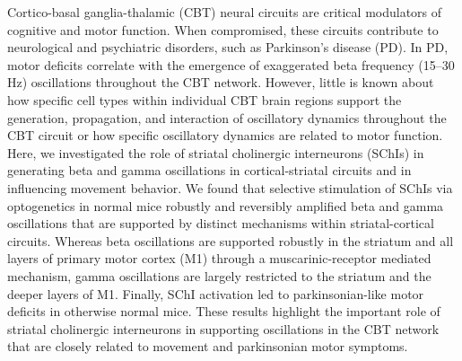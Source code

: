 Cortico-basal ganglia-thalamic (CBT) neural circuits are critical modulators of cognitive and motor function.
When compromised, these circuits contribute to neurological and psychiatric disorders, such as Parkinson’s disease (PD).
In PD, motor deficits correlate with the emergence of exaggerated beta frequency (15–30 Hz) oscillations throughout the CBT network.
However, little is known about how specific cell types within individual CBT brain regions support the generation, propagation, and interaction of oscillatory dynamics throughout the CBT circuit or how specific oscillatory dynamics are related to motor function.
Here, we investigated the role of striatal cholinergic interneurons (SChIs) in generating beta and gamma oscillations in cortical-striatal circuits and in influencing movement behavior.
We found that selective stimulation of SChIs via optogenetics in normal mice robustly and reversibly amplified beta and gamma oscillations that are supported by distinct mechanisms within striatal-cortical circuits.
Whereas beta oscillations are supported robustly in the striatum and all layers of primary motor cortex (M1) through a muscarinic-receptor mediated mechanism, gamma oscillations are largely restricted to the striatum and the deeper layers of M1.
Finally, SChI activation led to parkinsonian-like motor deficits in otherwise normal mice.
These results highlight the important role of striatal cholinergic interneurons in supporting oscillations in the CBT network that are closely related to movement and parkinsonian motor symptoms.
